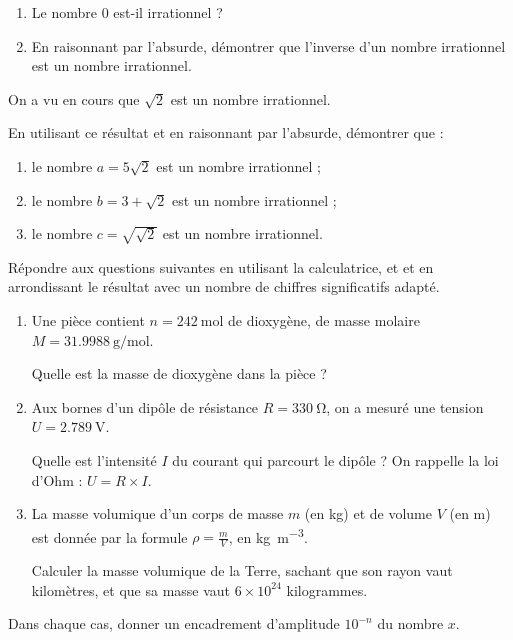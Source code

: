 \exo

\begin{enumerate}
\item Le nombre $0$ est-il irrationnel ?
\item En raisonnant par l'absurde, démontrer que l'inverse d'un nombre irrationnel est un nombre irrationnel.
\end{enumerate}

\exo

On a vu en cours que $\sqrt{2}$ est un nombre irrationnel.

En utilisant ce résultat et en raisonnant par l'absurde, démontrer que :
\begin{enumerate}
\item le nombre $a=5\sqrt{2}$ est un nombre irrationnel ;
\item le nombre $b=3+\sqrt{2}$ est un nombre irrationnel ;
\item le nombre $c=\sqrt{\sqrt{2}}$ est un nombre irrationnel.
\end{enumerate}

\exo

Répondre aux questions suivantes en utilisant la calculatrice, et et en arrondissant le résultat avec un nombre de chiffres significatifs adapté.
\begin{enumerate}
\item Une pièce contient $n=\SI{242}{\mole}$ de dioxygène, de masse molaire $M=\SI{31,9988}{\gram\per\mole}$.

Quelle est la masse de dioxygène dans la pièce ?

\medskip
\item Aux bornes d'un dipôle de résistance $R=\SI{330}{\ohm}$, on a mesuré une tension $U=\SI{2,789}{\volt}$.

Quelle est l'intensité $I$ du courant qui parcourt le dipôle ? On rappelle la loi d'Ohm : $U=R\times I$.

\medskip
\item La masse volumique d'un corps de masse $m$ (en kg) et de volume $V$ (en m) est donnée par la formule $\rho=\frac{m}{V}$, en \si{\kilo\gram\per\m^3}.

Calculer la masse volumique de la Terre, sachant que son rayon vaut  kilomètres, et que sa masse vaut $6\times 10^{24}$ kilogrammes.
\end{enumerate}

\exo

Dans chaque cas, donner un encadrement d'amplitude $10^{-n}$ du nombre $x$.

